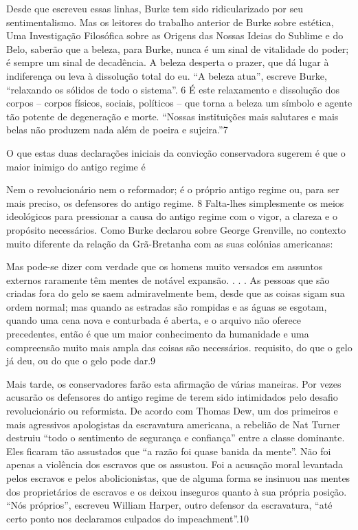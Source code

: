  \par 
Desde que escreveu essas linhas, Burke tem sido ridicularizado por seu sentimentalismo. Mas os leitores do trabalho anterior de Burke sobre estética, Uma Investigação Filosófica sobre as Origens das Nossas Ideias do Sublime e do Belo, saberão que a beleza, para Burke, nunca é um sinal de vitalidade do poder; é sempre um sinal de decadência. A beleza desperta o prazer, que dá lugar à indiferença ou leva à dissolução total do eu. “A beleza atua”, escreve Burke, “relaxando os sólidos de todo o sistema”. {\color{blue}6} É este relaxamento e dissolução dos corpos – corpos físicos, sociais, políticos – que torna a beleza um símbolo e agente tão potente de degeneração e morte. “Nossas instituições mais salutares e mais belas não produzem nada além de poeira e sujeira.”{\color{blue}7}
 \par 
O que estas duas declarações iniciais da convicção conservadora sugerem é que o maior inimigo do antigo regime é
 \par 
Nem o revolucionário nem o reformador; é o próprio antigo regime ou, para ser mais preciso, os defensores do antigo regime. {\color{blue}8} Falta-lhes simplesmente os meios ideológicos para pressionar a causa do antigo regime com o vigor, a clareza e o propósito necessários. Como Burke declarou sobre George Grenville, no contexto muito diferente da relação da Grã-Bretanha com as suas colónias americanas:
 \par 
Mas pode-se dizer com verdade que os homens muito versados ​​em assuntos externos raramente têm mentes de notável expansão. . . . As pessoas que são criadas fora do gelo se saem admiravelmente bem, desde que as coisas sigam sua ordem normal; mas quando as estradas são rompidas e as águas se esgotam, quando uma cena nova e conturbada é aberta, e o arquivo não oferece precedentes, então é que um maior conhecimento da humanidade e uma compreensão muito mais ampla das coisas são necessários. requisito, do que o gelo já deu, ou do que o gelo pode dar.{\color{blue}9}
 \par 
Mais tarde, os conservadores farão esta afirmação de várias maneiras. Por vezes acusarão os defensores do antigo regime de terem sido intimidados pelo desafio revolucionário ou reformista. De acordo com Thomas Dew, um dos primeiros e mais agressivos apologistas da escravatura americana, a rebelião de Nat Turner destruiu “todo o sentimento de segurança e confiança” entre a classe dominante. Eles ficaram tão assustados que “a razão foi quase banida da mente”. Não foi apenas a violência dos escravos que os assustou. Foi a acusação moral levantada pelos escravos e pelos abolicionistas, que de alguma forma se insinuou nas mentes dos proprietários de escravos e os deixou inseguros quanto à sua própria posição. “Nós próprios”, escreveu William Harper, outro defensor da escravatura, “até certo ponto nos declaramos culpados do impeachment”.{\color{blue}10}
